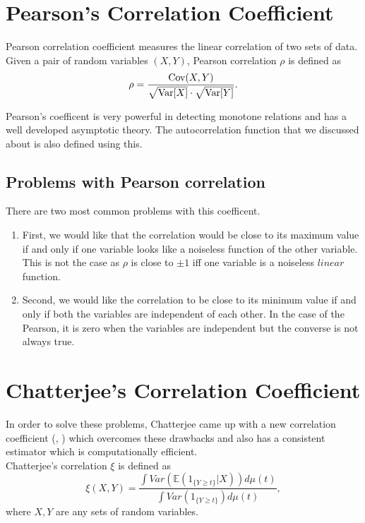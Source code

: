 \documentclass{article}
\begin{document}
\section{Pearson's Correlation Coefficient}
	Pearson correlation coefficient measures the linear correlation of two sets of data.
	Given a pair of random variables $(X, Y)$, Pearson correlation $\rho$ is defined as
	$$\rho = \frac{\text{Cov}(X, Y)}{\sqrt{\text{Var}[X]} \cdot \sqrt{\text{Var}[Y]}}.$$

	Pearson's coefficent is very powerful in detecting monotone relations and
	has a well developed asymptotic theory. The autocorrelation function that we discussed about is also defined using this.

	\subsection{Problems with Pearson correlation}
		There are two most common problems with this coefficent.
		\begin{enumerate}
			\item First, we would like that the correlation would be close to its maximum value
			if and only if one variable looks like a noiseless function of the other variable.
			This is not the case as $\rho$ is close to $\pm 1$ iff one variable is a noiseless $\textit{linear}$ function.
			\item Second, we would like the correlation to be close to its minimum value if and only if both the variables are independent of each other.
			In the case of the Pearson, it is zero when the variables are independent but the converse is not always true.
		\end{enumerate}

\section{Chatterjee's Correlation Coefficient}
	In order to solve these problems, Chatterjee came up with a new correlation coefficient (\cite{chatterjee2020sourav}, \cite{chatterjee2021mona}) which overcomes these drawbacks and also has a consistent estimator which is computationally efficient.\\
	Chatterjee's correlation $\xi$ is defined as
	$$\xi(X, Y) = \frac{\int Var(\mathbb{E}(1_{\{Y \geq t\}}|X)) d\mu(t)}{\int Var(1_{\{Y \geq t\}}) d\mu(t)},$$
	where $X, Y$ are any sets of random variables.
\end{document}

